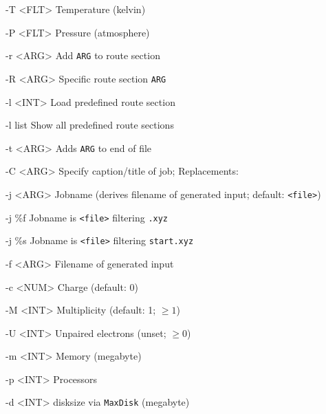 \documentclass[final, a4paper, columns=3, margin=1.0cm, 10pt]{refcard}
\begin{document}
\newsavebox{\replacements}
\begin{refcardlist}[labelfont=\ttfamily]
  \item[-T <FLT>] Temperature (kelvin)
  \item[-P <FLT>] Pressure (atmosphere)
  \item[-r <ARG>] Add \texttt{ARG} to route section
  \item[-R <ARG>] Specific route section \texttt{ARG}
  \item[-l <INT>] Load predefined route section 
  \item[-l list ] Show all predefined route sections
  \item[-t <ARG>] Adds \texttt{ARG} to end of file
  \item[-C <ARG>] Specify caption/title of job; Replacements:\\ \usebox{\replacements}
  \item[-j <ARG>] Jobname %
    (derives filename of generated input; default: \texttt{<file>})
  \item[-j \%f  ] Jobname is \texttt{<file>} filtering \texttt{.xyz}
  \item[-j \%s  ] Jobname is \texttt{<file>} filtering \texttt{start.xyz}
  \item[-f <ARG>] Filename of generated input
  \item[-c <NUM>] Charge (default: 0)
  \item[-M <INT>] Multiplicity (default: 1; \( \geq 1 \))
  \item[-U <INT>] Unpaired electrons (unset; \( \geq 0 \))
  \item[-m <INT>] Memory (megabyte)
  \item[-p <INT>] Processors
  \item[-d <INT>] disksize via \texttt{MaxDisk} (megabyte)
\end{refcardlist}
\end{document}
